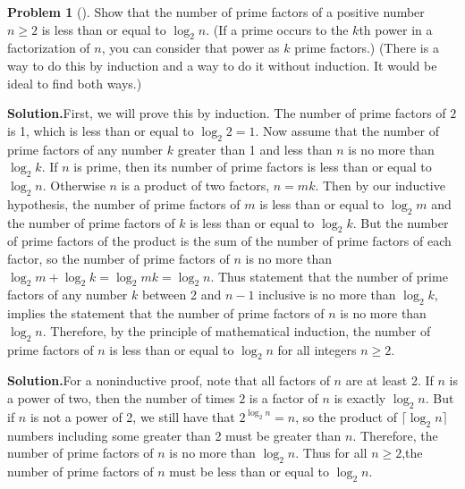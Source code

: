 \documentclass[10pt,]{book}
\theoremstyle{plain}
\theoremstyle{definition}
\newtheorem{activity}[project]{Problem}
\theoremstyle{definition}
\numberwithin{equation}{chapter}
\begin{document}
\begin{activity}[]\label{activity-369}
Show that the number of prime factors of a positive number \(n\ge 2\) is less than or equal to \(\log_2 n\).  (If a prime occurs to the \(k\)th power in a factorization of \(n\), you can consider that power as \(k\) prime factors.)  (There is a way to do this by induction and a way to do it without induction.  It would be ideal to find both ways.)%
\par\medskip\noindent%
\textbf{Solution.}\quad First, we will prove this by induction. The number of prime factors of \(2\) is 1, which is less than or equal to \(\log_2 2=1\). Now assume that the number of prime factors of any number \(k\) greater than 1 and less than \(n\) is no more than \(\log_2 k\). If \(n\) is prime, then its number of prime factors is less than or equal to \(\log_2 n\). Otherwise \(n\) is a product of two factors, \(n=mk\). Then by our inductive hypothesis, the number of prime factors of \(m\) is less than or equal to \(\log_2 m\) and the number of prime factors of \(k\) is less than or equal to \(\log_2 k\). But the number of prime factors of the product is the sum of the number of prime factors of each factor, so the number of prime factors of \(n\) is no more than \(\log_2 m +\log_2 k=\log_2 mk= \log_2 n\). Thus statement that the number of prime factors of any number \(k\) between 2 and \(n-1\) inclusive is no more than \(\log_2 k\), implies the statement that the number of prime factors of \(n\) is no more than \(\log_2 n\). Therefore, by the principle of mathematical induction, the number of prime factors of \(n\) is less than or equal to \(\log_2 n\) for all integers \(n\ge 2\).%
\par\medskip\noindent%
\textbf{Solution.}\quad For a noninductive proof, note that all factors of \(n\) are at least 2. If \(n\) is a power of two, then the number of times \(2\) is a factor of \(n\) is exactly \(\log_2 n\). But if \(n\) is not a power of 2, we still have that \(2^{\log_2 n}=n\), so the product of \(\lceil\log_2 n\rceil\) numbers including some greater than 2 must be greater than \(n\). Therefore, the number of prime factors of \(n\) is no more than \(\log_2 n\). Thus for all \(n\ge2\),the number of prime factors of \(n\) must be less than or equal to \(\log_2 n\).%
\end{activity}
\end{document}

